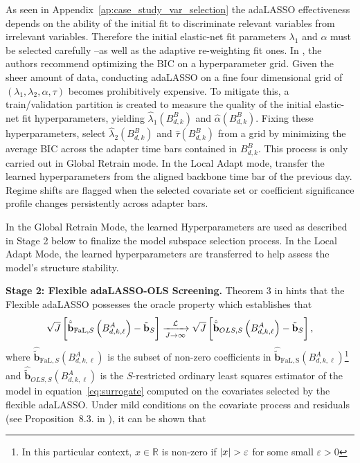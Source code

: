 \documentclass[10pt,a4paper,oneside]{article}
\newcommand{\R}{\mathbb{R}}
\DeclarePairedDelimiter{\aval}{\lvert}{\rvert} %
\begin{document}
As seen in Appendix~\ref{ap:case_study_var_selection} the adaLASSO effectiveness depends on the ability of the initial fit to discriminate relevant variables from irrelevant variables. Therefore the initial elastic-net fit parameters \(\lambda_1\) and \(\alpha\) must be selected carefully --as well as the adaptive re-weighting fit ones. In \cite{MEDEIROS2016255}, the authors recommend optimizing the BIC on a hyperparameter grid. Given the sheer amount of data, conducting adaLASSO on a fine four dimensional grid of \((\lambda_1, \lambda_2, \alpha, \tau)\) becomes prohibitively expensive. To mitigate this, a train/validation partition is created to measure the quality of the initial elastic-net fit hyperparameters, yielding  \(\hat{\lambda}_1 \left( B^B_{d, k} \right)\) and \(\hat{\alpha}\left( B^B_{d, k} \right)\). Fixing these hyperparameters, select \(\hat{\lambda}_2\left( B^B_{d, k} \right)\) and \(\hat{\tau}\left( B^B_{d,k} \right)\) from a grid by minimizing the average BIC across the adapter time bars contained in \(B^B_{d,k}\). This process is only carried out in Global Retrain mode. In the Local Adapt mode, transfer the learned hyperparameters from the aligned backbone time bar of the previous day. Regime shifts are flagged when the selected covariate set or coefficient significance profile changes persistently across adapter bars.

In the Global Retrain Mode, the learned Hyperparameters are used as described in Stage 2 below to finalize the model subspace selection process. In the Local Adapt Mode, the learned hyperparameters are transferred to help assess the model's structure stability.
\medskip

\noindent\textbf{Stage 2: Flexible adaLASSO-OLS Screening.} Theorem 3 in \cite{MEDEIROS2016255} hints that the Flexible adaLASSO possesses the oracle property which establishes that
$$
    \sqrt{J} \left[\hat{\tilde{\mathbf{b}}}_{\mathrm{FaL},S} \left( B^A_{d, k, \ell} \right) - \tilde{\mathbf{b}}_S \right] \xrightarrow[J \rightarrow \infty]{\mathcal{L}}\\ \sqrt{J} \left[\hat{\tilde{\mathbf{b}}}_{OLS, S} \left( B^A_{d, k, \ell} \right) - \tilde{\mathbf{b}}_S\right],
$$
where $\hat{\tilde{\mathbf{b}}}_{\mathrm{FaL},S}\left( B^A_{d, k, \ell} \right)$ is the subset of non-zero coefficients in $\hat{\tilde{\mathbf{b}}}_{\mathrm{FaL,S}}\left( B^A_{d, k, \ell} \right)$\footnote{In this particular context, $x \in \R$ is non-zero if $\aval{x} > \varepsilon$ for some small $\varepsilon > 0$} and $\hat{\tilde{\mathbf{b}}}_{OLS, S}\left( B^A_{d, k, \ell} \right)$ is the $S$-restricted ordinary least squares estimator of the model in equation~\eqref{eq:surrogate} computed on the covariates selected by the flexible adaLASSO. Under mild conditions on the covariate process and residuals (see Proposition~8.3. in \cite{hamilton_time_1994}), it can be shown that
\end{document}
